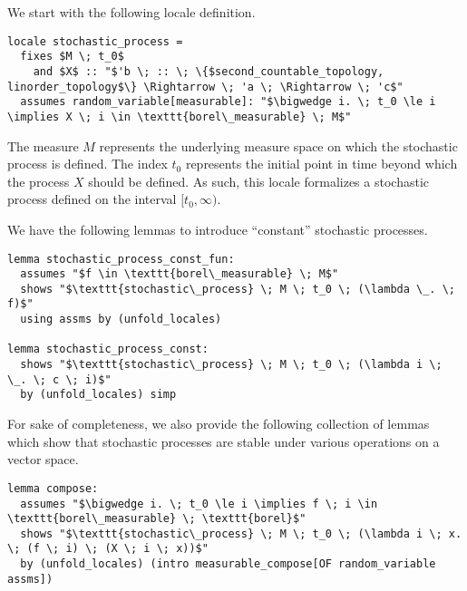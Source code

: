We start with the following locale definition.

\begin{isadefinition}
{\small
\begin{lstlisting}[style=isabelle]
locale stochastic_process =
  fixes $M \; t_0$ 
    and $X$ :: "$'b \; :: \; \{$second_countable_topology, linorder_topology$\} \Rightarrow \; 'a \; \Rightarrow \; 'c$"
  assumes random_variable[measurable]: "$\bigwedge i. \; t_0 \le i \implies X \; i \in \texttt{borel\_measurable} \; M$"
\end{lstlisting}
}
\end{isadefinition}

The measure $M$ represents the underlying measure space on which the stochastic process is defined. The index $t_0$ represents the initial point in time beyond which the process $X$ should be defined. As such, this locale formalizes a stochastic process defined on the interval $[t_0, \infty)$. 

We have the following lemmas to introduce ``constant'' stochastic processes.

\begin{isalemma}
{\small
\begin{lstlisting}[style=isabelle]
lemma stochastic_process_const_fun:
  assumes "$f \in \texttt{borel\_measurable} \; M$"
  shows "$\texttt{stochastic\_process} \; M \; t_0 \; (\lambda \_. \; f)$"
  using assms by (unfold_locales)

lemma stochastic_process_const:
  shows "$\texttt{stochastic\_process} \; M \; t_0 \; (\lambda i \; \_. \; c \; i)$" 
  by (unfold_locales) simp

\end{lstlisting}
}
\end{isalemma}

For sake of completeness, we also provide the following collection of lemmas which show that stochastic processes are stable under various operations on a vector space.

\begin{isalemma}
{\small
\begin{lstlisting}[style=isabelle]
lemma compose:
  assumes "$\bigwedge i. \; t_0 \le i \implies f \; i \in \texttt{borel\_measurable} \; \texttt{borel}$"
  shows "$\texttt{stochastic\_process} \; M \; t_0 \; (\lambda i \; x. \; (f \; i) \; (X \; i \; x))$"
  by (unfold_locales) (intro measurable_compose[OF random_variable assms])
  \end{lstlisting}
}
\end{isalemma}


